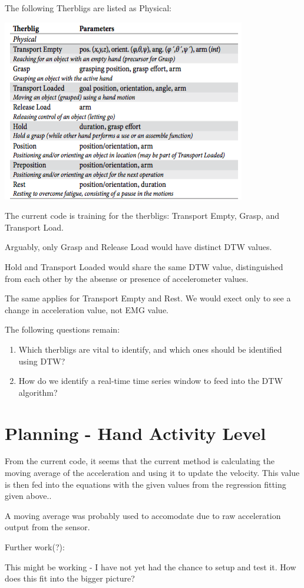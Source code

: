 \documentclass[12pt]{article}
\begin{document}
The following Therbligs are listed as Physical:

\includegraphics[scale = 0.75]{Therbligs.png}
 
The current code is training for the therbligs: Transport Empty, Grasp, and Transport Load.


Arguably, only Grasp and Release Load would have distinct DTW values. 


Hold and Transport Loaded would share the same DTW value, distinguished from each other by the absense or presence of accelerometer values. 

The same applies for Transport Empty and Rest. We would exect only to see a change in acceleration value, not EMG value.

The following questions remain:

\begin{enumerate}

\item Which therbligs are vital to identify, and which ones should be identified using DTW?

\item How do we identify a real-time time series window to feed into the DTW algorithm?

\end{enumerate}



\section{Planning - Hand Activity Level}


From the current code, it seems that the current method is calculating the moving average of the acceleration and using it to update the velocity. This value is then fed into the equations with the given values from the regression fitting given above..

A moving average was probably used to accomodate due to raw acceleration output from the sensor.

Further work(?):

This might be working - I have not yet had the chance to setup and test it. How does this fit into the bigger picture? 
\end{document}

